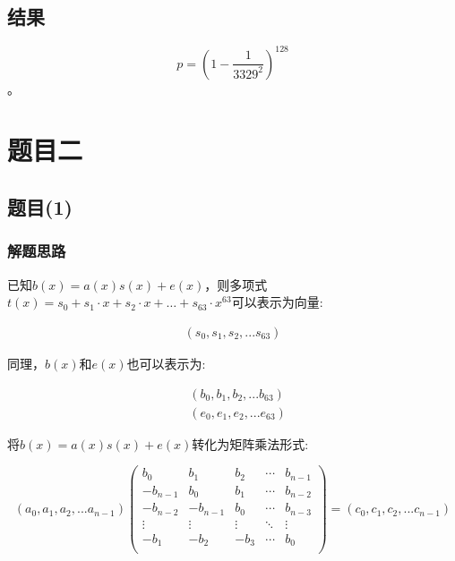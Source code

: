 \documentclass[12pt,a4paper]{article}
\numberwithin{equation}{section}
\begin{document}
\subsection{结果}

\begin{equation}
	p = \left(1 - \frac{1}{3329^2}\right)^{128}
\end{equation}。


\section{题目二}

\subsection{题目(1)}

\subsubsection{解题思路}

已知$b(x)=a(x)s(x)+e(x)$，则多项式$t(x)=s_0+s_1 \cdot x + s_2 \cdot x + \ldots + s_63 \cdot x^{63}$可以表示为向量:

\begin{align}
	(s_0,s_1,s_2,...s_{63})
\end{align}

同理，$b(x)$和$e(x)$也可以表示为:

\begin{align}
	 & (b_0,b_1,b_2,...b_{63}) \\
	 & (e_0,e_1,e_2,...e_{63})
\end{align}

将$b(x)=a(x)s(x)+e(x)$转化为矩阵乘法形式:

\begin{equation}
	(a_0,a_1,a_2,...a_{n-1})
	\left(
	\begin{smallmatrix}
			b_0      & b_1      & b_2    & \cdots & b_{n-1} \\
			-b_{n-1} & b_0      & b_1    & \cdots & b_{n-2} \\
			-b_{n-2} & -b_{n-1} & b_0    & \cdots & b_{n-3} \\
			\vdots   & \vdots   & \vdots & \ddots & \vdots  \\
			-b_1     & -b_2     & -b_3   & \cdots & b_0     \\
		\end{smallmatrix}
	\right)
	=
	(c_0,c_1,c_2,...c_{n-1})
\end{equation}
\end{document}
